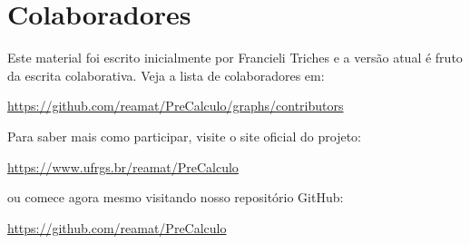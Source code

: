 
\chapter*{Colaboradores}

Este material foi escrito inicialmente por Francieli Triches e a versão atual é fruto da escrita colaborativa. Veja a lista de colaboradores em:
\begin{center}
  \url{https://github.com/reamat/PreCalculo/graphs/contributors}
\end{center}

Para saber mais como participar, visite o site oficial do projeto:
\begin{center}
  \url{https://www.ufrgs.br/reamat/PreCalculo}
\end{center}
ou comece agora mesmo visitando nosso repositório GitHub:
\begin{center}
  \url{https://github.com/reamat/PreCalculo}
\end{center}
